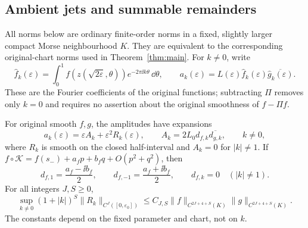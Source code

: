\subsection{Ambient jets and summable remainders}

All norms below are ordinary finite-order norms in a fixed, slightly
larger compact Morse neighbourhood $K$.  They are equivalent to the
corresponding original-chart norms used in Theorem~\ref{thm:main}.
For $k\ne0$, write
\[
 \widehat f_k(\varepsilon)=\int_0^1
 f(z(\sqrt{2\varepsilon},\theta))e^{-2\pi\ii k\theta}\,\dd\theta,
 \qquad a_k(\varepsilon)=L(\varepsilon)
 \widehat f_k(\varepsilon)\overline{\widehat g_k(\varepsilon)}.
\]
These are the Fourier coefficients of the original functions; subtracting
$\Pi$ removes only $k=0$ and requires no assertion about the original
smoothness of $f-\Pi f$.

\begin{proposition}\label{prop:elliptic-jets}
For original smooth $f,g$, the amplitudes have expansions
\begin{equation}\label{eq:jet-amplitudes}
 a_k(\varepsilon)=\varepsilon A_k+\varepsilon^2R_k(\varepsilon),
 \qquad
 A_k=2L_0d_{f,k}\overline{d_{g,k}},\qquad k\ne0,
\end{equation}
where $R_k$ is smooth on the closed half-interval and $A_k=0$ for
$|k|\ne1$.  If
$f\circ\mathcal K=f(s_-)+a_fp+b_fq+O(p^2+q^2)$, then
\begin{equation}\label{ell:first-mode-jets}
 d_{f,1}=\frac{a_f-\ii b_f}{2},\qquad
 d_{f,-1}=\frac{a_f+\ii b_f}{2},\qquad d_{f,k}=0\quad(|k|\ne1).
\end{equation}
For all integers $J,S\geq0$,
\begin{equation}\label{eq:elliptic-remainder-norm}
 \sup_{k\ne0}(1+|k|)^S
 \|R_k\|_{C^J([0,\varepsilon_0])}
 \leq C_{J,S}
 \|f\|_{C^{2J+4+S}(K)}\|g\|_{C^{2J+4+S}(K)}.
\end{equation}
The constants depend on the fixed parameter and chart, not on $k$.
\end{proposition}

